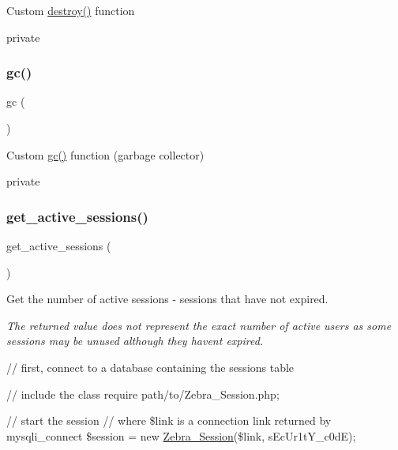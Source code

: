 Custom \mbox{\hyperlink{class_zebra___session_aaec5812f6b4eb6835f88d3baa06a002a}{destroy()}} function

private \mbox{\label{class_zebra___session_a14ff7ef4b198ff14884dd8c564264ca3}} 
\subsubsection{\texorpdfstring{gc()}{gc()}}
{\footnotesize\ttfamily gc (\begin{DoxyParamCaption}{ }\end{DoxyParamCaption})}

Custom \mbox{\hyperlink{class_zebra___session_a14ff7ef4b198ff14884dd8c564264ca3}{gc()}} function (garbage collector)

private \mbox{\label{class_zebra___session_a7d6d31df5f4285519ff1efbc783c36a7}} 
\subsubsection{\texorpdfstring{get\+\_\+active\+\_\+sessions()}{get\_active\_sessions()}}
{\footnotesize\ttfamily get\+\_\+active\+\_\+sessions (\begin{DoxyParamCaption}{ }\end{DoxyParamCaption})}

Get the number of active sessions -\/ sessions that have not expired.

{\itshape The returned value does not represent the exact number of active users as some sessions may be unused although they haven\textquotesingle{}t expired.}

{\ttfamily  // first, connect to a database containing the sessions table}

{\ttfamily // include the class require \textquotesingle{}path/to/\+Zebra\+\_\+\+Session.\+php\textquotesingle{};}

{\ttfamily // start the session // where \$link is a connection link returned by mysqli\+\_\+connect \$session = new \mbox{\hyperlink{class_zebra___session}{Zebra\+\_\+\+Session}}(\$link, \textquotesingle{}s\+Ec\+Ur1t\+Y\+\_\+c0dE\textquotesingle{});}

